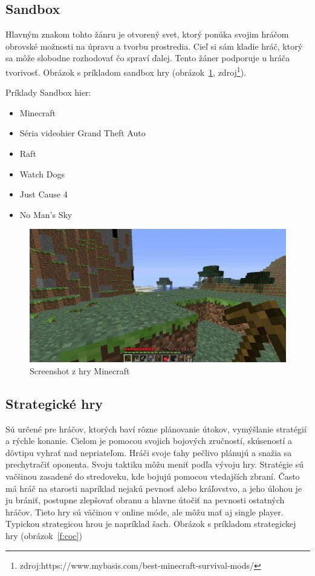 \documentclass[10pt,oneside,slovak,a4paper]{article}
\begin{document}
\subsection{Sandbox} \label{zanre:sandbox}

Hlavným znakom tohto žánru je otvorený svet, ktorý ponúka svojim hráčom obrovské možnosti na úpravu a tvorbu prostredia. Cieľ si sám kladie hráč, ktorý sa môže slobodne rozhodovať čo spraví ďalej. Tento žáner podporuje u hráča tvorivosť. Obrázok s príkladom sandbox hry (obrázok~\ref{f:minecraft}, zdroj\footnote{zdroj:https://www.mybasis.com/best-minecraft-survival-mods/}).

Príklady Sandbox hier:
\begin{itemize}
\item Minecraft
\item Séria videohier Grand Theft Auto
\item Raft
\item Watch Dogs
\item Just Cause 4
\item No Man's Sky
\end{itemize}

\begin{figure}[tbh]
\centering
\includegraphics[scale=0.2]{minecraft.jpg}
\caption{Screenshot z hry Minecraft}
\label{f:minecraft}
\end{figure}

\subsection{Strategické hry} \label{zanre:strategicke}

Sú určené pre hráčov, ktorých baví rôzne plánovanie útokov, vymýšlanie stratégií a rýchle konanie. Cielom je pomocou svojich bojových zručností, skúseností a dôvtipu vyhrať nad nepriateľom. Hráči svoje ťahy pečlivo plánujú a snažia sa prechytračiť oponenta. Svoju taktiku môžu meniť podľa vývoju hry. Stratégie sú vačšinou zasadené do stredoveku, kde bojujú pomocou vtedajších zbraní. Často má hráč na starosti napríklad nejakú pevnosť alebo kráľovstvo, a jeho úlohou je ju brániť, postupne zlepšovať obranu a hlavne útočiť na pevnosti ostatných hráčov. Tieto hry sú väčinou v online móde, ale môžu mať aj single player.  Typickou strategicou hrou je napríklad šach. Obrázok s príkladom strategickej hry (obrázok~\ref{f:coc})
\end{document}
